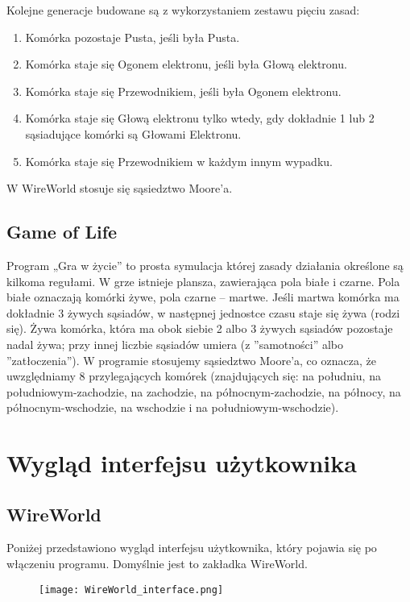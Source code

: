 \documentclass[10pt, oneside]{article}
\begin{document}
Kolejne generacje budowane są z wykorzystaniem zestawu pięciu zasad:
\begin{enumerate}
\item Komórka pozostaje Pusta, jeśli była Pusta.
\item Komórka staje się Ogonem elektronu, jeśli była Głową elektronu.
\item Komórka staje się Przewodnikiem, jeśli była Ogonem elektronu.
\item Komórka staje się Głową elektronu tylko wtedy, gdy dokładnie 1 lub 2 sąsiadujące komórki są Głowami Elektronu.
\item Komórka staje się Przewodnikiem w każdym innym wypadku.
\end{enumerate}

W WireWorld stosuje się sąsiedztwo Moore'a.

\subsection{Game of Life}
Program „Gra w życie” to prosta symulacja której zasady działania określone są kilkoma regułami. W grze istnieje plansza, zawierająca pola białe
i czarne. Pola białe oznaczają komórki żywe, pola czarne – martwe. Jeśli
martwa komórka ma dokładnie 3 żywych sąsiadów, w następnej jednostce czasu staje się żywa (rodzi się). Żywa komórka, która ma obok siebie 2
albo 3 żywych sąsiadów pozostaje nadal żywa; przy innej liczbie sąsiadów
umiera (z ”samotności” albo ”zatłoczenia”). W programie stosujemy sąsiedztwo Moore’a, co oznacza, że uwzględniamy 8 przylegających komórek
(znajdujących się: na południu, na południowym-zachodzie, na zachodzie,
na północnym-zachodzie, na północy, na północnym-wschodzie, na wschodzie i na południowym-wschodzie).
\section{Wygląd interfejsu użytkownika}
\subsection{WireWorld}
Poniżej przedstawiono wygląd interfejsu użytkownika, który pojawia się po włączeniu programu. Domyślnie jest to zakładka WireWorld.

\begin{figure}[H]
	\centering
	\texttt{[image: WireWorld\_interface.png]}
	
\end{figure}
\end{document}
